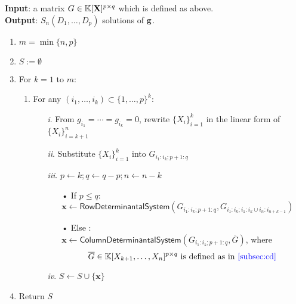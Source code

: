 \documentclass[11pt]{article}
\numberwithin{Property}{section}
\numberwithin{Theorem}{section}
\numberwithin{Proposition}{section}
\numberwithin{Lemma}{section}
\numberwithin{Corollary}{section}
\numberwithin{Definition}{section}
\numberwithin{Remark}{section}
\numberwithin{Conjecture}{section}
\numberwithin{Problem}{section}
\numberwithin{Claim}{section}
\theoremstyle{definition}
\numberwithin{Example}{section}
\renewcommand{\leq}{\leqslant}
\def\bar{\overline}
\newcommand{\field}{\mathbb{K}} %
\newcommand{\mat}[1]{\mathbf{\MakeUppercase{#1}}} %
\newcommand{\improve}[1]{\textcolor{blue}{#1}} %
\begin{document}
\begin{algorithm}[]
\caption{$\mathsf{Start Matrix Row Degress}$}
\label{StartMatRow}
{\bf Input}: a matrix $G \in \field[\mat{X}]^{p \times q}$ which is defined as above.\\
{\bf Output}: $S_{n}(D_1, \ldots, D_p)$ solutions of ${\bf g}$.
\begin{enumerate}
\item $m = \min \{n,p\}$
\item $S := \emptyset$
\item For $k = 1$ to $m$: 
\begin{enumerate}
\item For any  $(i_1, \ldots, i_k) \subset \{1, \ldots, p\}^k$:
\begin{itemize}
\item[\emph{i}.] From $g_{i_1} = \cdots = g_{i_k} = 0$, rewrite $\{X_i\}_{i = 1}^k$ in the linear form of $\{X_{i}\}_{i=k+1}^n$
\item[\emph{ii}.] Substitute $\{X_i\}_{i = 1}^k$ into $G_{i_1:i_k\mathbf{;}p+1:q}$
\item[\emph{iii}.] $p \gets k; q \gets q-p; n \gets n - k$
\begin{itemize}
\item[•] If $p \leq q$:\\ \hspace{1cm} $\mathbf{x} \gets \mathsf{RowDeterminantal System}(G_{i_1:i_k\mathbf{;}p+1:q}, G_{i_1:i_k;i_1:i_k \cup i_{n}:i_{n+k-1}})$
\item[•] Else :\\ \quad $\mathbf{x} \gets \mathsf{ColumnDeterminantal System}(G_{i_1:i_k\mathbf{;}p+1:q},\bar{G})$, where 
\[\bar{G} \in \field[X_{k+1}, \ldots, X_n]^{p \times q} \ \mathrm{is \ defined \ as \ in \ \improve{\cref{subsec:cd}}} \ \] 
\end{itemize}
\item[\emph{iv}.] $S \gets S \cup \{\mathbf{x}\}$
\end{itemize}
\end{enumerate}
\item Return $S$
\end{enumerate} 
\end{algorithm}
\end{document}
